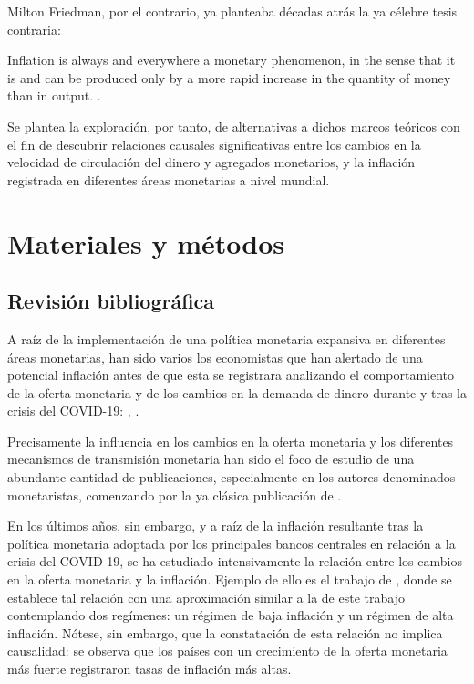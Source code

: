 \documentclass[titlepage, 12pt]{article}
\begin{document}
Milton Friedman, por el contrario, ya planteaba décadas atrás la ya célebre tesis contraria:
\begin{displayquote}
    Inflation is always and everywhere a monetary phenomenon, in the sense that it is and can be produced only by a more rapid increase in the quantity of money than in output. \autocite[24]{friedman1970}.
\end{displayquote}

Se plantea la exploración, por tanto, de alternativas a dichos marcos teóricos con el fin de descubrir relaciones causales significativas entre los cambios en la velocidad de circulación del dinero y agregados monetarios, y la inflación registrada en diferentes áreas monetarias a nivel mundial.

\section{Materiales y métodos}

\subsection{Revisión bibliográfica}

A raíz de la implementación de una política monetaria expansiva en diferentes áreas monetarias, han sido varios los economistas que han alertado de una potencial inflación antes de que esta se registrara analizando el comportamiento de la oferta monetaria y de los cambios en la demanda de dinero durante y tras la crisis del COVID-19: \cite{castaneda2020}, \cite{congdon2020}.

Precisamente la influencia en los cambios en la oferta monetaria y los diferentes mecanismos de transmisión monetaria han sido el foco de estudio de una abundante cantidad de publicaciones, especialmente en los autores denominados monetaristas, comenzando por la ya clásica publicación de \cite{friedman1956}.

En los últimos años, sin embargo, y a raíz de la inflación resultante tras la política monetaria adoptada por los principales bancos centrales en relación a la crisis del COVID-19, se ha estudiado intensivamente la relación entre los cambios en la oferta monetaria y la inflación. Ejemplo de ello es el trabajo de \cite{borio2023}, donde se establece tal relación con una aproximación similar a la de este trabajo contemplando dos regímenes: un régimen de baja inflación y un régimen de alta inflación. Nótese, sin embargo, que la constatación de esta relación no implica causalidad: se observa que los países con un crecimiento de la oferta monetaria más fuerte registraron tasas de inflación más altas.
\end{document}
